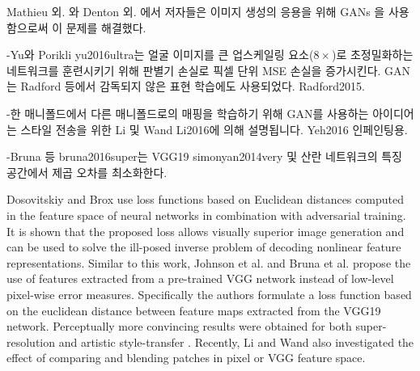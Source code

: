 \documentclass[10pt,twocolumn,letterpaper]{article}
\newcommand{\kor}[1]{#1}
\newcommand{\eng}[1]{}
\begin{document}
\eng{
In Mathieu et al. \cite{Mathieu2015} and Denton et al. \cite{Denton2015} the authors tackled this problem by employing \acp{GAN} \cite{Goodfellow14GAN} for the application of image generation.
}\kor{
Mathieu 외. \cite{Mathieu2015}와 Denton 외. \cite{Denton2015}에서 저자들은 이미지 생성의 응용을 위해 \acp{GAN} \cite{Goodfellow14GAN}을 사용함으로써 이 문제를 해결했다.
} \eng{
Yu and Porikli \cite{yu2016ultra} augment pixel-wise \ac{MSE} loss with a discriminator loss to train a network that super-resolves face images with large upscaling factors ($8\times$). \acp{GAN} were also used for unsupervised representation learning in Radford et al. \cite{Radford2015}.
}\kor{
-Yu와 Porikli yu2016ultra는 얼굴 이미지를 큰 업스케일링 요소($8\times$)로 초정밀화하는 네트워크를 훈련시키기 위해 판별기 손실로 픽셀 단위 MSE 손실을 증가시킨다. GAN는 Radford 등에서 감독되지 않은 표현 학습에도 사용되었다. Radford2015.
}
\eng{
The idea of using \acp{GAN} to learn a mapping from one manifold to another is described by Li and Wand \cite{Li2016} for style transfer and Yeh et al. \cite{Yeh2016} for inpainting.
}\kor{
-한 매니폴드에서 다른 매니폴드로의 매핑을 학습하기 위해 GAN를 사용하는 아이디어는 스타일 전송을 위한 Li 및 Wand Li2016에 의해 설명됩니다. Yeh2016 인페인팅용.
}
\eng{
Bruna et al. \cite{bruna2016super} minimize the squared error in the feature spaces of VGG19 \cite{simonyan2014very} and scattering networks.
}\kor{
-Bruna 등 bruna2016super는 VGG19 simonyan2014very 및 산란 네트워크의 특징 공간에서 제곱 오차를 최소화한다.
}

Dosovitskiy and Brox \cite{dosovitskiy2016generating} use loss functions based on Euclidean distances computed in the feature space of neural networks in combination with adversarial training. It is shown that the proposed loss allows visually superior image generation and can be used to solve the ill-posed inverse problem of decoding nonlinear feature representations.
Similar to this work, Johnson et al. \cite{Johnson16PercepLoss} and Bruna et al. \cite{bruna2016super} propose the use of features extracted from a pre-trained VGG network instead of low-level pixel-wise error measures. Specifically the authors formulate a loss function based on the euclidean distance between feature maps extracted from the VGG19 \cite{simonyan2014very} network. Perceptually more convincing results were obtained for both super-resolution and artistic style-transfer \cite{Gatys2015nips,Gatys2016cvpr}. Recently, Li and Wand \cite{Li2016} also investigated the effect of comparing and blending patches in pixel or VGG feature space.
\end{document}
